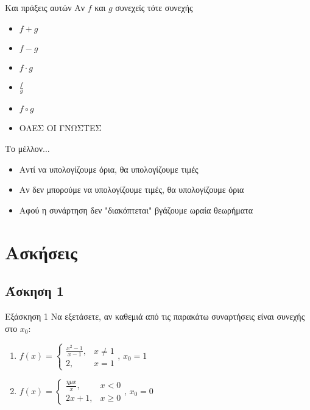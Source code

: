 \documentclass[greek]{beamer}
\begin{document}
\begin{frame}{Και πράξεις αυτών}
        Αν $f$ και $g$ συνεχείς τότε συνεχής
        \begin{itemize}
                \item $f+g$ \pause
                \item $f-g$ \pause
                \item $f\cdot g$ \pause
                \item $\frac{f}{g}$ \pause
                \item $f\circ g$ \pause
                \item ΟΛΕΣ ΟΙ ΓΝΩΣΤΕΣ
        \end{itemize}
\end{frame}

\begin{frame}{Το μέλλον...}
        \begin{itemize}
                \item Αντί να υπολογίζουμε όρια, θα υπολογίζουμε τιμές \pause
                \item Αν δεν μπορούμε να υπολογίζουμε τιμές, θα υπολογίζουμε όρια \pause
                \item Αφού η συνάρτηση δεν "διακόπτεται" βγάζουμε ωραία θεωρήματα
        \end{itemize}
\end{frame}

\section{Ασκήσεις}
\subsection{Άσκηση 1}
\begin{frame}[label=Άσκηση1]{Εξάσκηση 1}
        Να εξετάσετε, αν καθεμιά από τις παρακάτω συναρτήσεις είναι συνεχής στο $x_0$:
        \begin{enumerate}
                \item $f(x)=\begin{cases}
                                      \frac{x^2-1}{x-1}, & x\ne 1 \\
                                      2,                 & x=1
                              \end{cases}$, $x_0=1$ \pause
                \item $f(x)=\begin{cases}
                                      \frac{ημx}{x}, & x<0    \\
                                      2x+1,          & x\ge 0
                              \end{cases}$, $x_0=0$
        \end{enumerate}

\end{frame}
\end{document}
